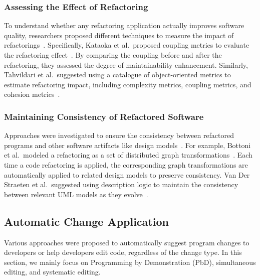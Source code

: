 \documentclass[runningheads,a4paper]{llncs}
\begin{document}
\subsubsection{Assessing the Effect of Refactoring} 
To understand whether any refactoring application actually improves software quality, researchers proposed 
different techniques to measure the impact of refactorings~\cite{Kataoka2002:evaluateRefactor,Tahvildari2003:MAE}. Specifically, Kataoka et al.~proposed coupling metrics to evaluate the refactoring effect~\cite{Kataoka2002:evaluateRefactor}. By comparing the coupling before and after the refactoring, they assessed the degree of maintainability enhancement. Similarly, Tahvildari et al.~suggested using a catalogue of object-oriented metrics to estimate refactoring impact, including complexity metrics, coupling metrics, and cohesion metrics~\cite{Tahvildari2003:MAE}. 
 
\subsubsection{Maintaining Consistency of Refactored Software} 
Approaches were investigated to ensure the consistency between refactored programs and other software artifacts like design models~\cite{Bottoni2003:coordinatedTransformation,Straeten2003:UML}. For example, Bottoni et al.~modeled a refactoring as a set of distributed graph transformations~\cite{Bottoni2003:coordinatedTransformation}. Each time a code refactoring is applied, the corresponding graph transformations are automatically applied to related design models to preserve consistency. Van Der Straeten et al.~suggested using description logic to maintain the consistency between relevant UML models as they evolve~\cite{Straeten2003:UML}.
\subsection{Automatic Change Application}
\label{sec:automatic}

Various approaches were proposed to automatically suggest program changes to developers or help developers edit code, regardless of the change type. In this section, we mainly focus on Programming by Demonstration (PbD), simultaneous editing, and systematic editing.
\end{document}
